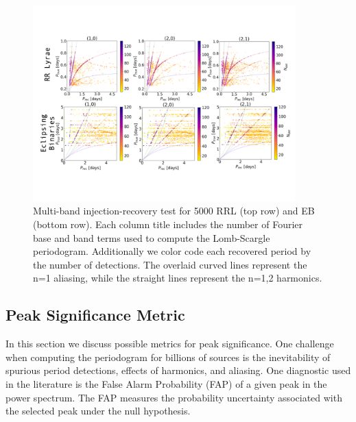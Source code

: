 \documentclass[DM,authoryear,toc]{lsstdoc}
\begin{document}
\begin{figure}
  \includegraphics[width=0.9\textwidth]{figures/multi_lsp_rectest.pdf}
  \centering 
  \caption{Multi-band injection-recovery test for 5000 RRL (top row) and EB (bottom row). Each column title includes the number of Fourier base and band terms used to compute the Lomb-Scargle periodogram. Additionally we color code each recovered period by the number of detections. The overlaid curved lines represent the n=1 aliasing, while the straight lines represent the n=1,2 harmonics.}
\end{figure}


\subsection{Peak Significance Metric}

In this section we discuss possible metrics for peak significance. One challenge when computing the periodogram for billions of sources is the inevitability of spurious period detections, effects of harmonics, and aliasing. One diagnostic used in the literature is the False Alarm Probability (FAP) of a given peak in the power spectrum. The FAP measures the probability uncertainty associated with the selected peak under the null hypothesis.
\end{document}
